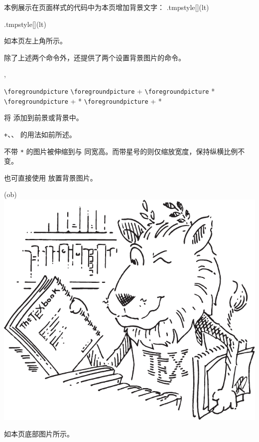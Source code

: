 \documentclass[twoside]{book}
\def\xampletext{\par}
\def\xampleprint{\xamplecode \xampleline \xampletext}
\begin{document}
本例展示在页面样式的代码中为本页增加背景文字：
\edef\next{\setpagestyle.{tmpstyle}[]}
\next{\background(lt){\textcolor{red}{\LARGE\CusTeX}}}
\begin{xample}
\edef\next{\setpagestyle.{tmpstyle}[]}
\next{\background(lt){\textcolor{red}{\LARGE\CusTeX}}}
\stopxamplecode
\xampleprint
如本页左上角所示。
\end{xample}

除了上述两个命令外，还提供了两个设置背景图片的命令。

\begin{function}{\foregroundpicture,\backgroundpicture}
  \begin{syntax}
    \verb|\foregroundpicture|     
    \verb|\foregroundpicture| +   
    \verb|\foregroundpicture|   * 
    \verb|\foregroundpicture| + * 
    \verb|\foregroundpicture| + *   
  \end{syntax}
将  添加到前景或背景中。

\texttt{+}、、 的用法如前所述。

不带 \verb|*| 的图片被伸缩到与  同宽高。而带星号的则仅缩放宽度，保持纵横比例不变。
\end{function}

也可直接使用  放置背景图片。
\begin{xample}
\background(ob){\includegraphics[width=\marginparwidth]{ctanlion.pdf}}
\stopxamplecode
\xampleprint
如本页底部图片所示。
\end{xample}
\end{document}
